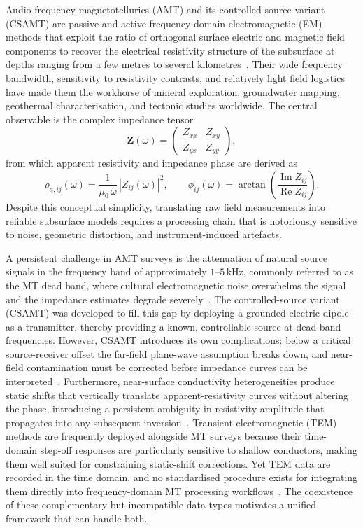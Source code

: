 \documentclass[review,12pt]{elsarticle}
\begin{document}
Audio-frequency magnetotellurics (AMT) and its controlled-source variant
(CSAMT) are passive and active frequency-domain electromagnetic (EM) methods
that exploit the ratio of orthogonal surface electric and magnetic field
components to recover the electrical resistivity structure of the subsurface
at depths ranging from a few metres to several kilometres~\citep{Cagniard1953,ZongeHughes1991}.
Their wide frequency bandwidth, sensitivity to resistivity contrasts, and
relatively light field logistics have made them the workhorse of mineral
exploration, groundwater mapping, geothermal characterisation, and tectonic
studies worldwide.
The central observable is the complex impedance tensor
\begin{equation}
  \mathbf{Z}(\omega) =
  \begin{pmatrix} Z_{xx} & Z_{xy} \\ Z_{yx} & Z_{yy} \end{pmatrix},
  \label{eq:impedance}
\end{equation}
from which apparent resistivity and impedance phase are derived as
\begin{equation}
  \rho_{a,ij}(\omega) = \frac{1}{\mu_0\,\omega}\,|Z_{ij}(\omega)|^2,\qquad
  \phi_{ij}(\omega) = \arctan\!\left(\frac{\operatorname{Im}Z_{ij}}
  {\operatorname{Re}Z_{ij}}\right).
  \label{eq:rhoaphase}
\end{equation}
Despite this conceptual simplicity, translating raw field measurements into
reliable subsurface models requires a processing chain that is notoriously
sensitive to noise, geometric distortion, and instrument-induced artefacts.

A persistent challenge in AMT surveys is the attenuation of natural source
signals in the frequency band of approximately $1$–$5\,\text{kHz}$, commonly
referred to as the MT dead band, where cultural electromagnetic noise
overwhelms the signal and the impedance estimates degrade
severely~\citep{ZongeHughes1991}.
The controlled-source variant (CSAMT) was developed to fill this gap by
deploying a grounded electric dipole as a transmitter, thereby providing a
known, controllable source at dead-band frequencies.
However, CSAMT introduces its own complications: below a critical
source-receiver offset the far-field plane-wave assumption breaks down,
and near-field contamination must be corrected before impedance curves can
be interpreted~\citep{WightPeltier1988}.
Furthermore, near-surface conductivity heterogeneities produce static shifts
that vertically translate apparent-resistivity curves without altering the
phase, introducing a persistent ambiguity in resistivity amplitude that
propagates into any subsequent inversion~\citep{Berdichevskyetal1998}.
Transient electromagnetic (TEM) methods are frequently deployed alongside
MT surveys because their time-domain step-off responses are particularly
sensitive to shallow conductors, making them well suited for constraining
static-shift corrections.
Yet TEM data are recorded in the time domain, and no standardised procedure
exists for integrating them directly into frequency-domain MT processing
workflows~\citep{NabighianMacnae1991,Christiansen2009}.
The coexistence of these complementary but incompatible data types
motivates a unified framework that can handle both.
\end{document}
